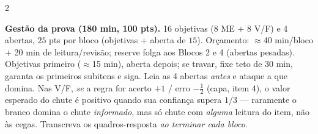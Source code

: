 \documentclass[10pt,a4paper]{article}
\begin{document}
\begin{multicols}{2}
\vspace{0.35em}
\noindent\colorbox{cinzasol}{\parbox{\dimexpr\linewidth-2\fboxsep}{\footnotesize
\textbf{Gestão da prova (180 min, 100 pts).} 16 objetivas (8 ME $+$ 8 V/F) e 4 abertas, $25$ pts por bloco (objetivas $+$ aberta de $15$). Orçamento: $\approx$40 min/bloco $+$ 20 min de leitura/revisão; reserve folga aos Blocos 2 e 4 (abertas pesadas). Objetivas primeiro ($\approx$15 min), aberta depois; se travar, fixe teto de 30 min, garanta os primeiros subitens e siga. Leia as 4 abertas \emph{antes} e ataque a que domina. Nas V/F, \emph{se} a regra for acerto $+1$ / erro $-\tfrac12$ (capa, item 4), o valor esperado do chute é positivo quando sua confiança supera $1/3$ --- raramente o branco domina o chute \emph{informado}, mas só chute com \emph{alguma} leitura do item, não às cegas. Transcreva os quadros-resposta \emph{ao terminar cada bloco}.}}

\vspace{0.3em}

\end{multicols}
\end{document}
